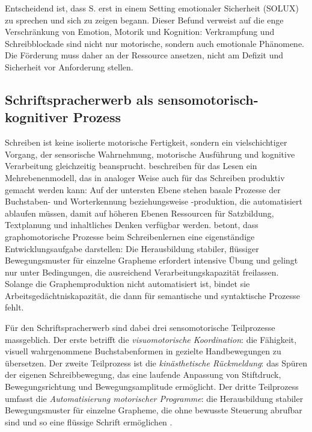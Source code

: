 \documentclass[ngerman, a4paper]{article}
\begin{document}
Entscheidend ist, dass S. erst in einem Setting emotionaler Sicherheit (SOLUX) zu
sprechen und sich zu zeigen begann. Dieser Befund verweist auf die enge Verschränkung
von Emotion, Motorik und Kognition: Verkrampfung und Schreibblockade sind nicht nur
motorische, sondern auch emotionale Phänomene. Die Förderung muss daher an der
Ressource ansetzen, nicht am Defizit und Sicherheit vor Anforderung stellen.


\subsection{Schriftspracherwerb als sensomotorisch-kognitiver Prozess}

Schreiben ist keine isolierte motorische Fertigkeit, sondern ein vielschichtiger Vorgang,
der sensorische Wahrnehmung, motorische Ausführung und kognitive Verarbeitung
gleichzeitig beansprucht. \textcite[Kap.\,1--4]{rosebrock2010grundlagen} beschreiben für das Lesen ein
Mehrebenenmodell, das in analoger Weise auch für das Schreiben produktiv gemacht werden
kann: Auf der untersten Ebene stehen basale Prozesse der Buchstaben- und Worterkennung
beziehungsweise -produktion, die automatisiert ablaufen müssen, damit auf höheren Ebenen
Ressourcen für Satzbildung, Textplanung und inhaltliches Denken verfügbar werden.
\textcite[S.\,2--4]{sturm2016graphomotorik} betont, dass graphomotorische Prozesse beim
Schreibenlernen eine eigenständige Entwicklungsaufgabe darstellen: Die Herausbildung
stabiler, flüssiger Bewegungsmuster für einzelne Grapheme erfordert intensive Übung
und gelingt nur unter Bedingungen, die ausreichend Verarbeitungskapazität freilassen.
Solange die Graphemproduktion nicht automatisiert ist,
bindet sie Arbeitsgedächtniskapazität, die dann für semantische und syntaktische Prozesse
fehlt.

Für den Schriftspracherwerb sind dabei drei sensomotorische Teilprozesse massgeblich.
Der erste betrifft die \textit{visuomotorische Koordination}: die Fähigkeit, visuell
wahrgenommene Buchstabenformen in gezielte Handbewegungen zu übersetzen. Der zweite
Teilprozess ist die \textit{kinästhetische Rückmeldung}: das Spüren der eigenen
Schreibbewegung, das eine laufende Anpassung von Stiftdruck, Bewegungsrichtung und
Bewegungsamplitude ermöglicht. Der dritte Teilprozess umfasst die
\textit{Automatisierung motorischer Programme}: die Herausbildung stabiler
Bewegungsmuster für einzelne Grapheme, die ohne bewusste Steuerung abrufbar sind und
so eine flüssige Schrift ermöglichen
\parencite[S.\,125--138]{nottbusch2017graphomotorik}.
\end{document}

